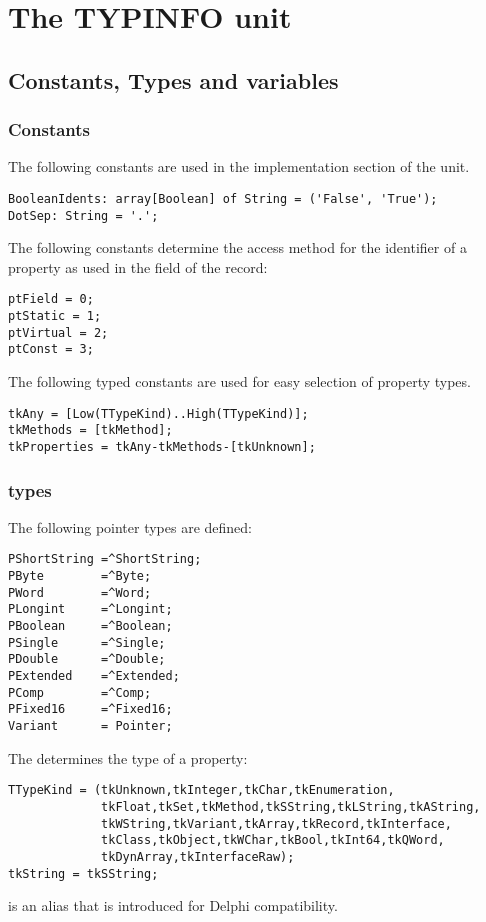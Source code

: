 \chapter{The TYPINFO unit}

\section{Constants, Types and variables}
\subsection{Constants}
The following constants are used in the implementation section of the unit.

\begin{verbatim}
BooleanIdents: array[Boolean] of String = ('False', 'True');
DotSep: String = '.';
\end{verbatim}
The following constants determine the access method for the  
identifier of a property as used in the  field of the 
 record:
\begin{verbatim}
ptField = 0;
ptStatic = 1;
ptVirtual = 2;
ptConst = 3;
\end{verbatim}
The following typed constants are used for easy selection of property types.
\begin{verbatim}
tkAny = [Low(TTypeKind)..High(TTypeKind)];
tkMethods = [tkMethod];
tkProperties = tkAny-tkMethods-[tkUnknown];
\end{verbatim}

\subsection{types}
The following pointer types are defined:
\begin{verbatim}
PShortString =^ShortString;
PByte        =^Byte;
PWord        =^Word;
PLongint     =^Longint;
PBoolean     =^Boolean;
PSingle      =^Single;
PDouble      =^Double;
PExtended    =^Extended;
PComp        =^Comp;
PFixed16     =^Fixed16;
Variant      = Pointer;
\end{verbatim}

The  determines the type of a property:
\begin{verbatim}
TTypeKind = (tkUnknown,tkInteger,tkChar,tkEnumeration,
             tkFloat,tkSet,tkMethod,tkSString,tkLString,tkAString,
             tkWString,tkVariant,tkArray,tkRecord,tkInterface,
             tkClass,tkObject,tkWChar,tkBool,tkInt64,tkQWord,
             tkDynArray,tkInterfaceRaw);
tkString = tkSString;
\end{verbatim}
 is an alias that is introduced for Delphi compatibility.


